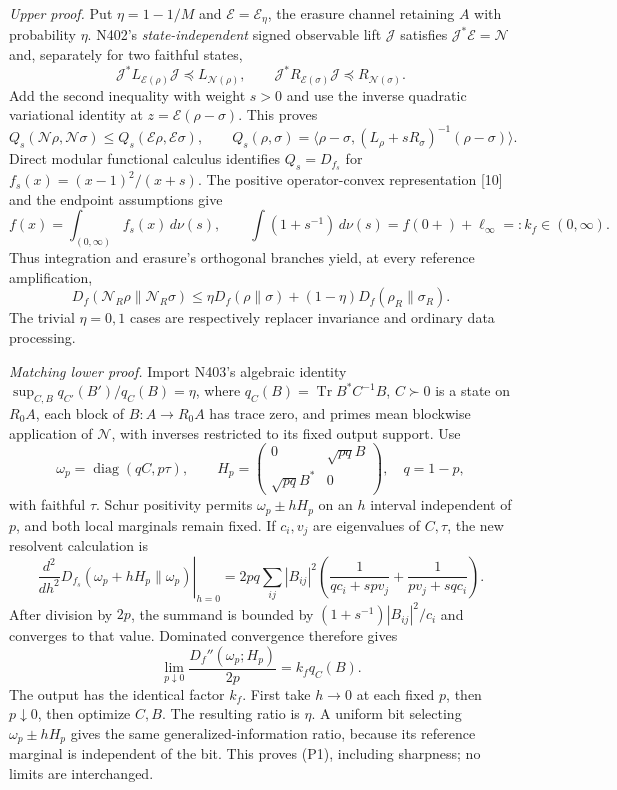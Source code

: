\documentclass[10pt,a4paper]{article}
\newcommand{\Tr}{\operatorname{Tr}}
\newcommand{\N}{\mathcal N}
\begin{document}
\textit{Upper proof.} Put $\eta=1-1/M$ and $\mathcal E=\mathcal E_\eta$, the erasure channel retaining $A$ with probability $\eta$. N402's \emph{state-independent} signed observable lift $\mathcal J$ satisfies $\mathcal J^*\mathcal E=\N$ and, separately for two faithful states,
\[
 \mathcal J^*L_{\mathcal E(\rho)}\mathcal J\preceq L_{\N(\rho)},\qquad
 \mathcal J^*R_{\mathcal E(\sigma)}\mathcal J\preceq R_{\N(\sigma)}.
\]
Add the second inequality with weight $s>0$ and use the inverse quadratic variational identity at $z=\mathcal E(\rho-\sigma)$. This proves
\[
 Q_s(\N\rho,\N\sigma)\le Q_s(\mathcal E\rho,\mathcal E\sigma),\qquad
 Q_s(\rho,\sigma)=\langle\rho-\sigma,(L_\rho+sR_\sigma)^{-1}(\rho-\sigma)\rangle.
\]
Direct modular functional calculus identifies $Q_s=D_{f_s}$ for $f_s(x)=(x-1)^2/(x+s)$. The positive operator-convex representation [10] and the endpoint assumptions give
\[
 f(x)=\int_{(0,\infty)}f_s(x)\,d\nu(s),\qquad
 \int(1+s^{-1})\,d\nu(s)=f(0+)+\ell_\infty=:k_f\in(0,\infty).
\]
Thus integration and erasure's orthogonal branches yield, at every reference amplification,
\[
 D_f(\N_R\rho\|\N_R\sigma)\le
 \eta D_f(\rho\|\sigma)+(1-\eta)D_f(\rho_R\|\sigma_R). \tag{P2}
\]
The trivial $\eta=0,1$ cases are respectively replacer invariance and ordinary data processing.

\textit{Matching lower proof.} Import N403's algebraic identity
$\sup_{C,B}q_{C'}(B')/q_C(B)=\eta$, where $q_C(B)=\Tr B^*C^{-1}B$, $C\succ0$ is a state on $R_0A$, each block of $B:A\to R_0A$ has trace zero, and primes mean blockwise application of $\N$, with inverses restricted to its fixed output support. Use
\[
 \omega_p=\operatorname{diag}(qC,p\tau),\qquad
 H_p=\begin{pmatrix}0&\sqrt{pq}B\\\sqrt{pq}B^*&0\end{pmatrix},\quad q=1-p,
\]
with faithful $\tau$. Schur positivity permits $\omega_p\pm hH_p$ on an $h$ interval independent of $p$, and both local marginals remain fixed. If $c_i,v_j$ are eigenvalues of $C,\tau$, the new resolvent calculation is
\[
 \left.\frac{d^2}{dh^2}D_{f_s}(\omega_p+hH_p\|\omega_p)\right|_{h=0}
 =2pq\sum_{ij}|B_{ij}|^2\left(\frac1{qc_i+spv_j}+\frac1{pv_j+sqc_i}\right).
\]
After division by $2p$, the summand is bounded by $(1+s^{-1})|B_{ij}|^2/c_i$ and converges to that value. Dominated convergence therefore gives
\[
 \lim_{p\downarrow0}\frac{D_f''(\omega_p;H_p)}{2p}=k_fq_C(B). \tag{P3}
\]
The output has the identical factor $k_f$. First take $h\to0$ at each fixed $p$, then $p\downarrow0$, then optimize $C,B$. The resulting ratio is $\eta$. A uniform bit selecting $\omega_p\pm hH_p$ gives the same generalized-information ratio, because its reference marginal is independent of the bit. This proves (P1), including sharpness; no limits are interchanged.
\end{document}
